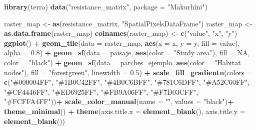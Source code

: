 \documentclass[
]{book}
\newenvironment{Shaded}{\begin{snugshade}}{\end{snugshade}}
\newcommand{\AttributeTok}[1]{\textcolor[rgb]{0.13,0.29,0.53}{#1}}
\newcommand{\ConstantTok}[1]{\textcolor[rgb]{0.56,0.35,0.01}{#1}}
\newcommand{\FloatTok}[1]{\textcolor[rgb]{0.00,0.00,0.81}{#1}}
\newcommand{\FunctionTok}[1]{\textcolor[rgb]{0.13,0.29,0.53}{\textbf{#1}}}
\newcommand{\NormalTok}[1]{#1}
\newcommand{\OtherTok}[1]{\textcolor[rgb]{0.56,0.35,0.01}{#1}}
\newcommand{\SpecialCharTok}[1]{\textcolor[rgb]{0.81,0.36,0.00}{\textbf{#1}}}
\newcommand{\StringTok}[1]{\textcolor[rgb]{0.31,0.60,0.02}{#1}}
\begin{document}
\begin{Shaded}
\begin{Highlighting}[]
\FunctionTok{library}\NormalTok{(terra)}
\FunctionTok{data}\NormalTok{(}\StringTok{"resistance\_matrix"}\NormalTok{, }\AttributeTok{package =} \StringTok{"Makurhini"}\NormalTok{)}

\NormalTok{raster\_map }\OtherTok{\textless{}{-}} \FunctionTok{as}\NormalTok{(resistance\_matrix, }\StringTok{"SpatialPixelsDataFrame"}\NormalTok{)}
\NormalTok{raster\_map }\OtherTok{\textless{}{-}} \FunctionTok{as.data.frame}\NormalTok{(raster\_map)}
\FunctionTok{colnames}\NormalTok{(raster\_map) }\OtherTok{\textless{}{-}} \FunctionTok{c}\NormalTok{(}\StringTok{"value"}\NormalTok{, }\StringTok{"x"}\NormalTok{, }\StringTok{"y"}\NormalTok{)}
\FunctionTok{ggplot}\NormalTok{() }\SpecialCharTok{+}  
  \FunctionTok{geom\_tile}\NormalTok{(}\AttributeTok{data =}\NormalTok{ raster\_map, }\FunctionTok{aes}\NormalTok{(}\AttributeTok{x =}\NormalTok{ x, }\AttributeTok{y =}\NormalTok{ y, }\AttributeTok{fill =}\NormalTok{ value), }\AttributeTok{alpha =} \FloatTok{0.8}\NormalTok{) }\SpecialCharTok{+} 
  \FunctionTok{geom\_sf}\NormalTok{(}\AttributeTok{data =}\NormalTok{ paisaje, }\FunctionTok{aes}\NormalTok{(}\AttributeTok{color =} \StringTok{"Study area"}\NormalTok{), }\AttributeTok{fill =} \ConstantTok{NA}\NormalTok{, }\AttributeTok{color =} \StringTok{"black"}\NormalTok{) }\SpecialCharTok{+}
  \FunctionTok{geom\_sf}\NormalTok{(}\AttributeTok{data =}\NormalTok{ parches\_ejemplo, }\FunctionTok{aes}\NormalTok{(}\AttributeTok{color =} \StringTok{"Habitat nodes"}\NormalTok{), }\AttributeTok{fill =} \StringTok{"forestgreen"}\NormalTok{, }\AttributeTok{linewidth =} \FloatTok{0.5}\NormalTok{) }\SpecialCharTok{+}
  \FunctionTok{scale\_fill\_gradientn}\NormalTok{(}\AttributeTok{colors =} \FunctionTok{c}\NormalTok{(}\StringTok{"\#000004FF"}\NormalTok{, }\StringTok{"\#1B0C42FF"}\NormalTok{, }\StringTok{"\#4B0C6BFF"}\NormalTok{, }\StringTok{"\#781C6DFF"}\NormalTok{,}
                                  \StringTok{"\#A52C60FF"}\NormalTok{, }\StringTok{"\#CF4446FF"}\NormalTok{, }\StringTok{"\#ED6925FF"}\NormalTok{, }\StringTok{"\#FB9A06FF"}\NormalTok{,}
                                  \StringTok{"\#F7D03CFF"}\NormalTok{, }\StringTok{"\#FCFFA4FF"}\NormalTok{))}\SpecialCharTok{+}
  \FunctionTok{scale\_color\_manual}\NormalTok{(}\AttributeTok{name =} \StringTok{""}\NormalTok{, }\AttributeTok{values =} \StringTok{"black"}\NormalTok{)}\SpecialCharTok{+}
  \FunctionTok{theme\_minimal}\NormalTok{() }\SpecialCharTok{+}
  \FunctionTok{theme}\NormalTok{(}\AttributeTok{axis.title.x =} \FunctionTok{element\_blank}\NormalTok{(),}
        \AttributeTok{axis.title.y =} \FunctionTok{element\_blank}\NormalTok{())}
\end{Highlighting}
\end{Shaded}
\end{document}
